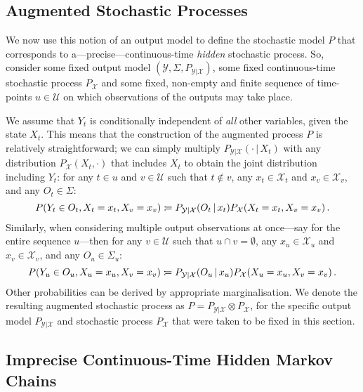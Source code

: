 \documentclass[3p]{elsarticle}
\newcommand{\states}{\mathcal{X}}
\newcommand{\observs}{\mathcal{Y}}
\newcommand{\coloneqq}{:\!=}
\begin{document}
\subsection{Augmented Stochastic Processes}\label{sec:aug_stochastic_processes}
We now use this notion of an output model to define the stochastic model $P$ that corresponds to a---precise---continuous-time \emph{hidden} stochastic process. 
So, consider some fixed output model $(\observs,\Sigma,P_{\observs\vert\states})$, some fixed continuous-time stochastic process $P_\states$ and some fixed, non-empty and finite sequence of time-points $u\in\mathcal{U}$ on which observations of the outputs may take place. 

We assume that $Y_t$ is conditionally independent of \emph{all} other variables, given the state $X_t$. This means that the construction of the augmented process $P$ is relatively straightforward; we can simply multiply $P_{\observs\vert\states}(\cdot\,\vert\,X_t)$ with any distribution $P_\states(X_t,\cdot)$ that includes $X_t$ to obtain the joint distribution including $Y_t$: for any $t\in u$ and $v\in\mathcal{U}$ such that $t\notin v$, any $x_t\in\states_t$ and $x_v\in\states_v$, and any $O_t\in\Sigma$:
\vspace{-2pt}
\begin{equation*}
P(Y_t\in O_t,X_t=x_t,X_v=x_v) \coloneqq P_{\observs\vert\states}(O_t\,\vert\,x_t)P_\states(X_t=x_t,X_v=x_v)\,.\vspace{-2pt}
\end{equation*}
Similarly, when considering multiple output observations at once---say for the entire sequence $u$---then for any $v\in\mathcal{U}$ such that $u\cap v=\emptyset$, any $x_u\in\states_u$ and $x_v\in\states_v$, and any $O_u\in\Sigma_u$:
\vspace{-2pt}
\begin{equation*}
P(Y_u\in O_u,X_u=x_u, X_v=x_v) \coloneqq P_{\observs\vert\states}(O_{u}\,\vert\,x_{u})P_\states(X_u=x_u,X_v=x_v)\,.\vspace{-2pt}
\end{equation*}
Other probabilities can be derived by appropriate marginalisation.
We denote the resulting augmented stochastic process as $P=P_{\observs\vert\states}\otimes P_\states$,
for the specific output model $P_{\observs\vert\states}$ and stochastic process $P_\states$ that were taken to be fixed in this section.
\vspace{-8pt}

\subsection{Imprecise Continuous-Time Hidden Markov Chains}\label{subsec:ICTHMC}
\end{document}
